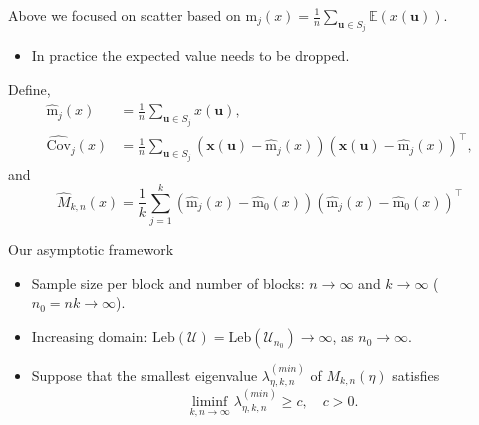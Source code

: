 \documentclass{beamer}
\begin{document}
\begin{frame}
  Above we focused on scatter based on $\mathrm{m}_{j}(x) = \frac{1}{n}
  \sum_{\bm u\in S_j} \mathbb{E}\left(x(\bm u)\right)$.
  \begin{itemize}
    \item[$\Rightarrow$] In practice the expected value needs to be dropped.
  \end{itemize}
  \pause
  Define,
  \begin{equation*}
    \begin{split}
      \hat{\mathrm{m}}_j(x) &= \frac{1}{n} \sum_{\bm u\in S_j}
      x(\bm u), \\
      \widehat{\mathrm{Cov}}_j(x) &= \frac{1}{n} \sum_{\bm u\in S_j}
      \left(\bm x(\bm u) - \hat{\mathrm{m}}_j(x)\right)
      \left(\bm x(\bm u) - \hat{\mathrm{m}}_j(x)\right)^\intercal,
    \end{split}
  \end{equation*}
  \pause
  and
  \begin{equation*}
    \hat{M}_{k, n}(x) = \frac{1}{k}\sum_{j=1}^k
    \left(\hat{\mathrm{m}}_j(x) - \hat{\mathrm{m}}_0(x)\right)
    \left(\hat{\mathrm{m}}_j(x) - \hat{\mathrm{m}}_0(x)\right)^\intercal
  \end{equation*}
\end{frame}


\begin{frame}{Our asymptotic framework}
  \begin{itemize}
    \item Sample size per block and number of blocks: $n\to\infty$ and
    $k\to\infty$ ($n_0 = nk\to\infty$).
    \pause
    \item Increasing domain: $\mathrm{Leb}\left(\mathcal{U}\right) =
    \mathrm{Leb}\left( \mathcal{U}_{n_0}\right) \to \infty$, as $n_0\to\infty$.
    \pause
    \item Suppose that the smallest eigenvalue $\lambda_{\eta, k, n}^{(min)}$ of
    $M_{k,n}(\eta)$ satisfies
    \begin{equation*}
      \liminf_{k,n\to\infty} \lambda_{\eta, k, n}^{(min)} \geq c,
      \quad c > 0.
    \end{equation*}
  \end{itemize}
\end{frame}

\end{document}
